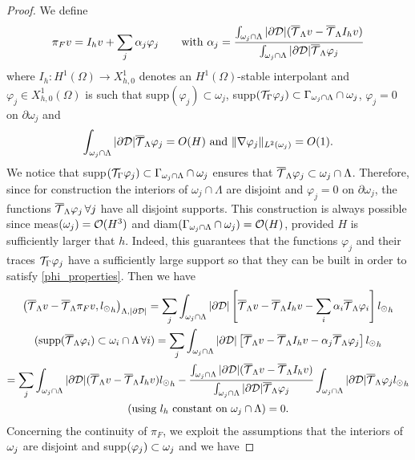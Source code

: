 \begin{proof}
We define
\begin{equation*}
\pi_F v = I_h v + \sum _j \alpha _j \varphi _j \qquad \text{with }\alpha_j =\frac{\int_{\omega _j \cap \Lambda}|\partial\mathcal{D}| ({\overline{\mathcal{T}}_\Lambda} v-{\overline{\mathcal{T}}_\Lambda} I_h v)}{\int_{\omega _j \cap \Lambda}|\partial\mathcal{D}|{\overline{\mathcal{T}}_\Lambda} \varphi _j}
\end{equation*}
where $I_h: H^1(\Omega) \rightarrow X_{h,0}^1$ denotes an $H^1(\Omega)$-stable interpolant
and $\varphi_j \in X_{h,0}^1(\Omega)$ is such that supp$(\varphi_j)\subset \omega_j$, supp$({\mathcal{T}_\Gamma} \varphi _j) \subset \Gamma_{\omega _j\cap \Lambda}\cap \omega_j$, $\varphi_j =0$ on $\partial \omega _j$ and 
\begin{equation}\label{phi_properties}
\int_{\patch\cap \Lambda}|\DD|\mtrace \varphi_j=O(H) \text{ and } \|\nabla \varphi _j\|_{L^2(\omega _j)}=O(1). 
\end{equation}
We notice that supp$({\mathcal{T}_\Gamma} \varphi_j) \subset \Gamma_{\omega _j\cap \Lambda}\cap \omega_j$ ensures that ${\overline{\mathcal{T}}_\Lambda} \varphi_j \subset \omega_j\cap \Lambda$. Therefore, since for construction the interiors of $\omega_j\cap \Lambda$  are disjoint and $\varphi _j = 0 $ on $\partial \omega_j$,  the functions ${\overline{\mathcal{T}}_\Lambda} \varphi_j\, \forall j$ have all disjoint supports. This construction is always possible since meas$(\omega _j) = \mathcal{O}(H^3)$ and diam$(\Gamma_{\omega _j\cap \Lambda} \cap \omega_j)=\mathcal{O}(H)$, provided $H$ is sufficiently larger that $h$. Indeed, this guarantees that the functions $\varphi _j$ and their traces ${\mathcal{T}_\Gamma} \varphi _j$ have a sufficiently large support so that they can be built in order to satisfy \eqref{phi_properties}.
Then we have
\begin{multline*}
\left({\overline{\mathcal{T}}_\Lambda} v - {\overline{\mathcal{T}}_\Lambda} \pi _F v  , {l_{\odot}}_h\right)_{\Lambda, |\partial\mathcal{D}|} = \sum _j \int_{\omega _j\cap \Lambda} |\partial\mathcal{D} |\left[ {\overline{\mathcal{T}}_\Lambda} v-{\overline{\mathcal{T}}_\Lambda} I_h v-\sum _i \alpha_i {\overline{\mathcal{T}}_\Lambda} \varphi _i \right]{l_{\odot}}_h \\
(\text{supp} ({\overline{\mathcal{T}}_\Lambda} \varphi _i )\subset \omega _i\cap \Lambda \, \forall i)  =\sum _j \int_{\omega _j\cap \Lambda}|\partial\mathcal{D}| \left[ {\overline{\mathcal{T}}_\Lambda} v-{\overline{\mathcal{T}}_\Lambda} I_h v-\alpha_j {\overline{\mathcal{T}}_\Lambda} \varphi _j \right]{l_{\odot}}_h\\
=\sum _j \int_{\omega _j\cap \Lambda} |\partial\mathcal{D}| ({\overline{\mathcal{T}}_\Lambda} v-{\overline{\mathcal{T}}_\Lambda}  I_h v) {l_{\odot}}_h - \frac{\int_{\omega _j\cap \Lambda} |\partial\mathcal{D}| ({\overline{\mathcal{T}}_\Lambda} v-{\overline{\mathcal{T}}_\Lambda} I_h v)}{\int_{\omega _j\cap \Lambda}|\partial\mathcal{D}|{\overline{\mathcal{T}}_\Lambda} \varphi _j} \int_{\omega _j\cap \Lambda} |\partial\mathcal{D}|{\overline{\mathcal{T}}_\Lambda} \varphi _j{l_{\odot}}_h\\ 
(\text{using $l_h$ constant on $\omega _j\cap \Lambda$})=0.
\end{multline*}
Concerning the continuity of $\pi_F$, we exploit the assumptions that the interiors of $\omega _j$ are disjoint and supp$(\varphi _j) \subset \omega _j$ and we have

\end{proof}

